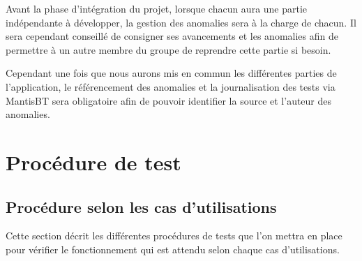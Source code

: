Avant la phase d'intégration du projet, lorsque chacun aura une partie indépendante à développer,
la gestion des anomalies sera à la charge de chacun. Il sera cependant conseillé de consigner ses
avancements et les anomalies afin de permettre à un autre membre du groupe de reprendre cette
partie si besoin.\newline

Cependant une fois que nous aurons mis en commun les différentes parties de l'application, le
référencement des anomalies et la journalisation des tests via MantisBT sera obligatoire afin de
pouvoir identifier la source et l'auteur des anomalies.


\chapter{Procédure de test}

\section{Procédure selon les cas d'utilisations}
Cette section décrit les différentes procédures de tests que l'on mettra en place pour vérifier
le fonctionnement qui est attendu selon chaque cas d'utilisations.

